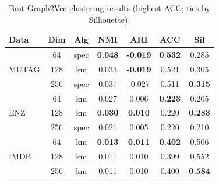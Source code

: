 \begin{table}
\centering
\scriptsize
\setlength{\tabcolsep}{4pt}
\begin{tabular}{l c c c c c c}
\toprule
\textbf{Data} & \textbf{Dim} & \textbf{Alg} & \textbf{NMI} & \textbf{ARI} & \textbf{ACC} & \textbf{Sil} \\
\midrule
 & 64  & spec & \textbf{0.048} & \textbf{-0.019} & \textbf{0.532} & 0.285 \\
   MUTAG     & 128 & km   & 0.033 & \textbf{-0.019} & 0.521 & 0.305 \\
       & 256 & spec & 0.037 & -0.027 & 0.511 & \textbf{0.315} \\
\midrule
    & 64  & km   & 0.027 & 0.006  & \textbf{0.223} & 0.205 \\
   ENZ    & 128 & km   & \textbf{0.030} & \textbf{0.010}  & 0.220 & \textbf{0.283} \\
       & 256 & spec & 0.021 & 0.005  & 0.220 & 0.210 \\
\midrule
   & 64  & km   & \textbf{0.013} & \textbf{0.011}  & \textbf{0.402} & 0.506 \\
IMDB       & 128 & km   & 0.011 & 0.010  & 0.399 & 0.552 \\
       & 256 & km   & 0.011 & 0.010  & 0.400 & \textbf{0.584} \\
\bottomrule
\end{tabular}
\caption{Best Graph2Vec clustering results (highest ACC; ties by Silhouette).}
\label{tab:graph2vec_cluster_best}
\end{table}


